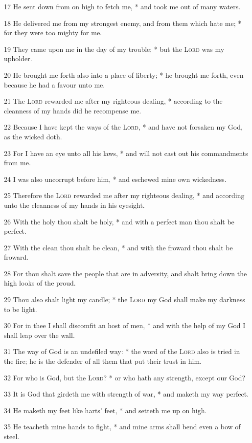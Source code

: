 17 He sent down from on high to fetch me, * and took me out of many waters.\par
18 He delivered me from my strongest enemy, and from them which hate me; * for they were too mighty for me.\par
19 They came upon me in the day of my trouble; * but the {\textsc{Lord}} was my upholder.\par
20 He brought me forth also into a place of liberty; * he brought me forth, even because he had a favour unto me.\par
21 The {\textsc{Lord}} rewarded me after my righteous dealing, * according to the cleanness of my hands did he recompense me.\par
22 Because I have kept the ways of the {\textsc{Lord}}, * and have not forsaken my God, as the wicked doth.\par
23 For I have an eye unto all his laws, * and will not cast out his commandments from me.\par
24 I was also uncorrupt before him, * and eschewed mine own wickedness.\par
25 Therefore the {\textsc{Lord}} rewarded me after my righteous dealing, * and according unto the cleanness of my hands in his eyesight.\par
26 With the holy thou shalt be holy, * and with a perfect man thou shalt be perfect.\par
27 With the clean thou shalt be clean, * and with the froward thou shalt be froward.\par
28 For thou shalt save the people that are in adversity, and shalt bring down the high looks of the proud.\par
29 Thou also shalt light my candle; * the {\textsc{Lord}} my God shall make my darkness to be light.\par
30 For in thee I shall discomfit an host of men, * and with the help of my God I shall leap over the wall.\par
31 The way of God is an undefiled way: * the word of the {\textsc{Lord}} also is tried in the fire; he is the defender of all them that put their trust in him.\par
32 For who is God, but the {\textsc{Lord}}? * or who hath any strength, except our God?\par
33 It is God that girdeth me with strength of war, * and maketh my way perfect.\par
34 He maketh my feet like harts' feet, * and setteth me up on high.\par
35 He teacheth mine hands to fight, * and mine arms shall bend even a bow of steel.\par
